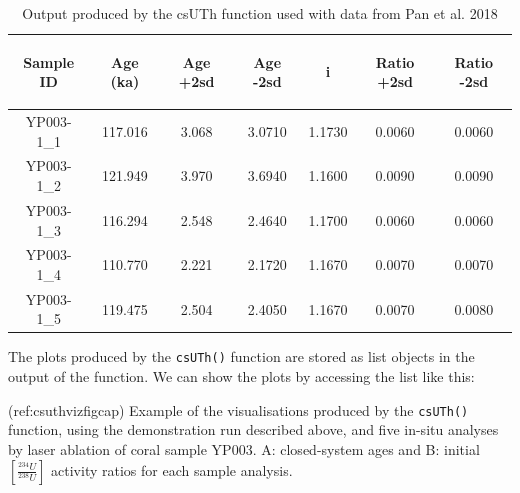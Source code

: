 \documentclass[]{elsarticle} %
\newenvironment{Shaded}{\begin{snugshade}}{\end{snugshade}}
\newcommand{\NormalTok}[1]{#1}
\newcommand{\SpecialCharTok}[1]{\textcolor[rgb]{0.00,0.00,0.00}{#1}}
\begin{document}
\begin{table}[ht]
\centering
\begin{tabular}{ccccccc}
  \hline
\begin{sideways} Sample ID \end{sideways} & \begin{sideways} Age (ka) \end{sideways} & \begin{sideways} Age +2sd \end{sideways} & \begin{sideways} Age -2sd \end{sideways} & \begin{sideways} [234U/238U]i \end{sideways} & \begin{sideways} Ratio +2sd \end{sideways} & \begin{sideways} Ratio -2sd \end{sideways} \\ 
  \hline
YP003-1\_1 & 117.016 & 3.068 & 3.0710 & 1.1730 & 0.0060 & 0.0060 \\ 
  YP003-1\_2 & 121.949 & 3.970 & 3.6940 & 1.1600 & 0.0090 & 0.0090 \\ 
  YP003-1\_3 & 116.294 & 2.548 & 2.4640 & 1.1700 & 0.0060 & 0.0060 \\ 
  YP003-1\_4 & 110.770 & 2.221 & 2.1720 & 1.1670 & 0.0070 & 0.0070 \\ 
  YP003-1\_5 & 119.475 & 2.504 & 2.4050 & 1.1670 & 0.0070 & 0.0080 \\ 
   \hline
\end{tabular}
\caption{\label{tab:panoutput}Output produced by the csUTh function used with data from Pan et al. 2018} 
\end{table}

The plots produced by the \texttt{csUTh()} function are stored as list objects in the output of the function. We can show the plots by accessing the list like this:

(ref:csuthvizfigcap) Example of the visualisations produced by the \texttt{csUTh()} function, using the demonstration run described above, and five in-situ analyses by laser ablation of coral sample YP003. A: closed-system ages and B: initial \([\frac{^{234}U}{^{238}U}]\) activity ratios for each sample analysis.

\begin{Shaded}
\end{Shaded}
\end{document}
